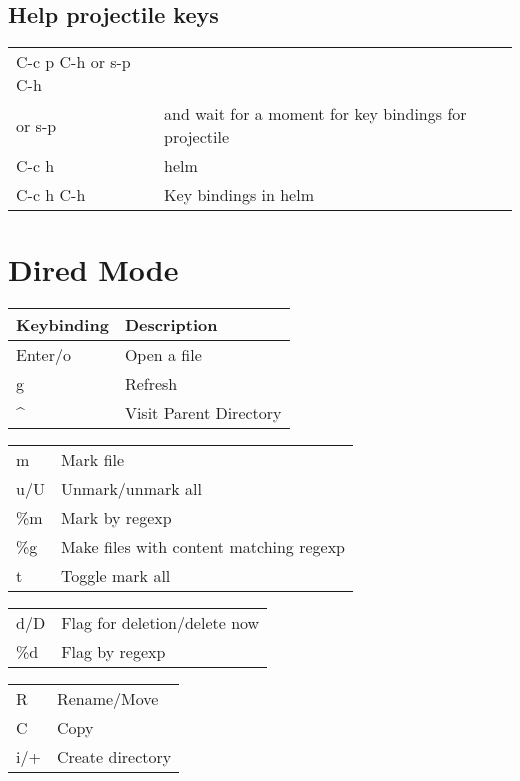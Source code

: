 \documentclass[11pt]{article}
\begin{document}
\subsection{Help projectile keys}
\label{sec:org2165359}
\begin{center}
\begin{tabular}{ll}
\hline
C-c p C-h or s-p C-h & \\
or s-p & and wait for a moment for key bindings for projectile\\
C-c h & helm\\
C-c h C-h & Key bindings in helm\\
\end{tabular}
\end{center}


\section{Dired Mode}
\label{sec:org38aa13f}
\begin{center}
\begin{tabular}{ll}
Keybinding & Description\\
\hline
Enter/o & Open a file\\
g & Refresh\\
\^{} & Visit Parent Directory\\
\end{tabular}
\end{center}

\begin{center}
\begin{tabular}{ll}
m & Mark file\\
u/U & Unmark/unmark all\\
\%m & Mark by regexp\\
\%g & Make files with content matching regexp\\
t & Toggle mark all\\
\end{tabular}
\end{center}

\begin{center}
\begin{tabular}{ll}
d/D & Flag for deletion/delete now\\
\%d & Flag by regexp\\
\end{tabular}
\end{center}

\begin{center}
\begin{tabular}{ll}
R & Rename/Move\\
C & Copy\\
i/+ & Create directory\\
\end{tabular}
\end{center}
\end{document}
